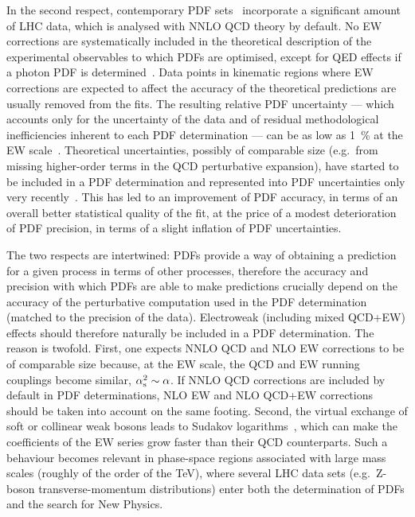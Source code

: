 In the second respect, contemporary PDF
sets~\cite{Harland-Lang:2014zoa,Ball:2017nwa,Hou:2019efy}
incorporate a significant amount of LHC data, which is analysed with NNLO QCD 
theory by default. No EW corrections are systematically included in the 
theoretical description of the experimental observables to which PDFs are 
optimised, except for QED effects if a photon PDF is 
determined~\cite{Schmidt:2015zda,Bertone:2017bme,Harland-Lang:2019pla}.
Data points in kinematic regions where EW corrections are expected to affect
the accuracy of the theoretical predictions are usually removed from the fits.
The resulting relative PDF uncertainty --- which accounts only for the
uncertainty of the data and of residual methodological inefficiencies inherent to 
each PDF determination --- can be as low as \SI{1}{\percent} at the EW
scale~\cite{Ball:2017nwa}. Theoretical uncertainties, possibly of comparable 
size (e.g.\ from missing higher-order terms in the QCD perturbative
expansion), have started to be included in a PDF determination and represented 
into PDF uncertainties only very 
recently~\cite{AbdulKhalek:2019bux,AbdulKhalek:2019ihb}. This has led to an 
improvement of PDF accuracy, in terms of an overall
better statistical quality of the fit, at the price of a modest deterioration 
of PDF precision, in terms of a slight inflation of PDF uncertainties.

The two respects are intertwined: PDFs provide a way of obtaining a prediction
for a given process in terms of other processes, therefore the accuracy and 
precision with which PDFs are able to make predictions crucially depend on 
the accuracy of the perturbative computation used in the PDF determination
(matched to the precision of the data). Electroweak (including mixed QCD+EW) 
effects should therefore naturally be included in a PDF determination. The 
reason is twofold. First, one expects NNLO QCD and NLO EW corrections to be of 
comparable size because, at the EW scale, the QCD and EW running couplings 
become similar, $\alpha_\mathrm{s}^2\sim \alpha$. If NNLO QCD corrections are included
by default in PDF determinations, NLO EW and NLO QCD+EW corrections should be
taken into account on the same footing. Second, the virtual exchange of soft or 
collinear weak bosons leads to Sudakov 
logarithms~\cite{Denner:2000jv,Denner:2001gw},
which can make the coefficients of the EW series grow faster than 
their QCD counterparts. Such a behaviour becomes relevant in
phase-space regions associated with large mass scales (roughly of the order
of the \si{\tera\electronvolt}), where several LHC data sets (e.g.\ Z-boson
transverse-momentum distributions) enter both the determination of PDFs and the search
for New Physics.

